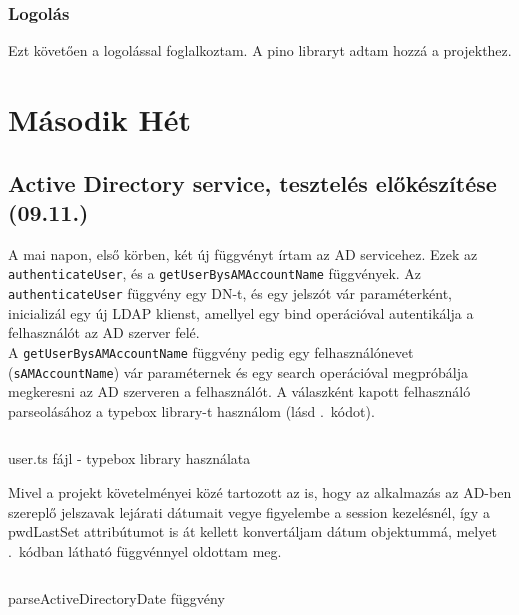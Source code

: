 \documentclass[a4paper]{article}
\newcommand{\inlts}[1]{\texttt{#1}}
\begin{document}
\subsubsection*{Logolás}

Ezt követően a logolással foglalkoztam. A pino libraryt adtam hozzá a projekthez.

\section{Második Hét}

\subsection{Active Directory service, tesztelés előkészítése (09.11.)}

A mai napon, első körben, két új függvényt írtam az AD servicehez. Ezek az \inlts{authenticateUser}, és
a \inlts{getUserBysAMAccountName} függvények. Az \inlts{authenticateUser} függvény egy DN-t, és egy
jelszót vár paraméterként, inicializál egy új LDAP klienst, amellyel egy bind operációval autentikálja a
felhasználót az AD szerver felé. \\

A \inlts{getUserBysAMAccountName} függvény pedig egy felhasználónevet (\inlts{sAMAccountName}) vár
paraméternek és egy search operációval megpróbálja megkeresni az AD szerveren a felhasználót. A
válaszként kapott felhasználó parseolásához a typebox library-t használom (lásd .~kódot).

\begin{listing}[!ht]
\inputminted[bgcolor=codebg, breaklines, breakanywhere, fontsize=\small]{typescript}{code/user.ts}
\caption{user.ts fájl - typebox library használata}
\label{listing:user_typebox}
\end{listing}

Mivel a projekt követelményei közé tartozott az is, hogy az alkalmazás az AD-ben szereplő jelszavak
lejárati dátumait vegye figyelembe a session kezelésnél, így a pwdLastSet attribútumot is át kellett
konvertáljam dátum objektummá, melyet .~kódban látható függvénnyel oldottam meg.

\begin{listing}[!ht]
\inputminted[bgcolor=codebg, breaklines, breakanywhere, fontsize=\small]{typescript}{code/activeDirectoryUtils.ts}
\caption{parseActiveDirectoryDate függvény}
\label{listing:active_directory_utils}
\end{listing}
\end{document}
